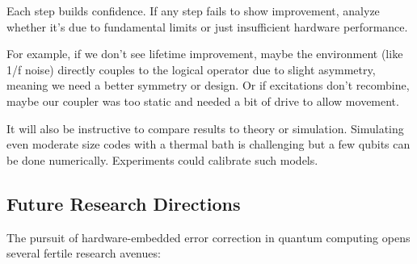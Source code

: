 \documentclass[11pt]{article}
\begin{document}
Each step builds confidence. If any step fails to show improvement, analyze whether it's due to fundamental limits or just insufficient hardware performance.

For example, if we don't see lifetime improvement, maybe the environment (like 1/f noise) directly couples to the logical operator due to slight asymmetry, meaning we need a better symmetry or design. Or if excitations don't recombine, maybe our coupler was too static and needed a bit of drive to allow movement.

It will also be instructive to compare results to theory or simulation. Simulating even moderate size codes with a thermal bath is challenging but a few qubits can be done numerically. Experiments could calibrate such models.

\subsection{Future Research Directions}
The pursuit of hardware-embedded error correction in quantum computing opens several fertile research avenues:
\end{document}
